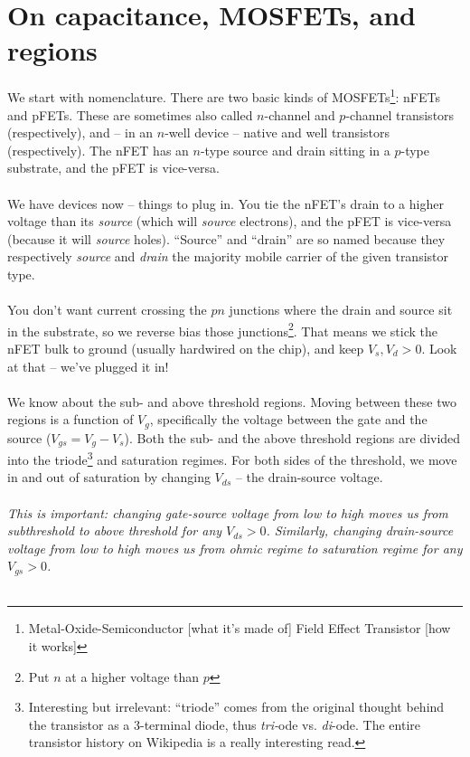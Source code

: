\documentclass[main]{subfiles}
\begin{document}

\section{On capacitance, MOSFETs, and regions}
We start with nomenclature. There are two basic kinds of MOSFETs\footnote{Metal-Oxide-Semiconductor [what it's made of] Field Effect Transistor [how it works]}: nFETs and pFETs. These are sometimes also called $n$-channel and $p$-channel transistors (respectively), and – in an $n$-well device – native and well transistors (respectively). The nFET has an $n$-type source and drain sitting in a $p$-type substrate, and the pFET is vice-versa.\\ \\
We have devices now – things to plug in. You tie the nFET's drain to a higher voltage than its \textsl{source} (which will \textsl{source} electrons), and the pFET is vice-versa (because it will \textsl{source} holes). ``Source'' and ``drain'' are so named because they respectively \textsl{source} and \textsl{drain} the majority mobile carrier of the given transistor type.\\ \\
You don't want current crossing the $pn$ junctions where the drain and source sit in the substrate, so we reverse bias those junctions\footnote{Put $n$ at a higher voltage than $p$}. That means we stick the nFET bulk to ground (usually hardwired on the chip), and keep $V_s, V_d > 0$. Look at that – we've plugged it in! \\ \\
We know about the sub- and above threshold regions. Moving between these two regions is a function of $V_g$, specifically the voltage between the gate and the source ($V_{gs} = V_g - V_s$). Both the sub- and the above threshold regions are divided into the triode\footnote{Interesting but irrelevant: ``triode'' comes from the original thought behind the transistor as a 3-terminal diode, thus \emph{tri-}ode vs. \emph{di}-ode. The entire transistor history on Wikipedia is a really interesting read.} and saturation regimes. For both sides of the threshold, we move in and out of saturation by changing $V_{ds}$ – the drain-source voltage.\\ \\
\textsl{This is important: changing \emph{gate-source} voltage from low to high moves us from subthreshold to above threshold for \emph{any} $V_{ds} > 0$. Similarly, changing \emph{drain-source} voltage from low to high moves us from ohmic regime to saturation regime for \emph{any} $V_{gs} > 0$.} \\ \\
\end{document}
